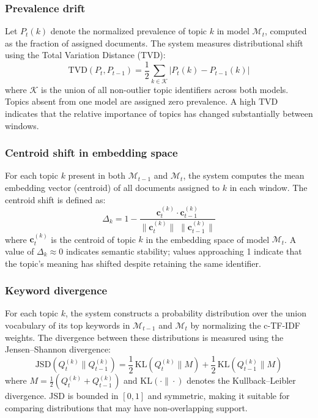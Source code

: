 \documentclass[conference]{IEEEtran}
\begin{document}
\subsubsection{Prevalence drift}
Let $P_t(k)$ denote the normalized prevalence of topic $k$ in model $\mathcal{M}_t$, computed as the fraction of assigned documents. The system measures distributional shift using the Total Variation Distance (TVD):
\begin{equation}
\label{eq:tvd}
    \mathrm{TVD}(P_t, P_{t-1}) = \frac{1}{2}\sum_{k \in \mathcal{K}} \lvert P_t(k) - P_{t-1}(k) \rvert
\end{equation}
where $\mathcal{K}$ is the union of all non-outlier topic identifiers across both models. Topics absent from one model are assigned zero prevalence. A high TVD indicates that the relative importance of topics has changed substantially between windows.

\subsubsection{Centroid shift in embedding space}
For each topic $k$ present in both $\mathcal{M}_{t-1}$ and $\mathcal{M}_t$, the system computes the mean embedding vector (centroid) of all documents assigned to $k$ in each window. The centroid shift is defined as:
\begin{equation}
\label{eq:centroid}
    \Delta_k = 1 - \frac{\mathbf{c}_t^{(k)} \cdot \mathbf{c}_{t-1}^{(k)}}{\lVert \mathbf{c}_t^{(k)} \rVert \; \lVert \mathbf{c}_{t-1}^{(k)} \rVert}
\end{equation}
where $\mathbf{c}_t^{(k)}$ is the centroid of topic $k$ in the embedding space of model $\mathcal{M}_t$. A value of $\Delta_k \approx 0$ indicates semantic stability; values approaching 1 indicate that the topic's meaning has shifted despite retaining the same identifier.

\subsubsection{Keyword divergence}
For each topic $k$, the system constructs a probability distribution over the union vocabulary of its top keywords in $\mathcal{M}_{t-1}$ and $\mathcal{M}_t$ by normalizing the c-TF-IDF weights. The divergence between these distributions is measured using the Jensen--Shannon divergence:
\begin{equation}
\label{eq:js}
    \mathrm{JSD}(Q_t^{(k)} \| Q_{t-1}^{(k)}) = \frac{1}{2}\,\mathrm{KL}(Q_t^{(k)} \| M) + \frac{1}{2}\,\mathrm{KL}(Q_{t-1}^{(k)} \| M)
\end{equation}
where $M = \frac{1}{2}(Q_t^{(k)} + Q_{t-1}^{(k)})$ and $\mathrm{KL}(\cdot\|\cdot)$ denotes the Kullback--Leibler divergence. JSD is bounded in $[0, 1]$ and symmetric, making it suitable for comparing distributions that may have non-overlapping support.
\end{document}
